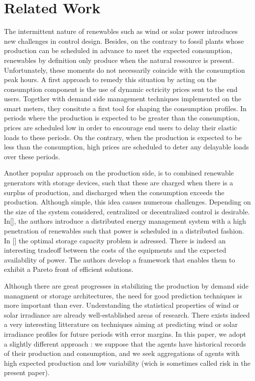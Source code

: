 \documentclass[conference]{IEEEtran}
\begin{document}
%
%

\section{Related Work}
\label{sec:related}

The intermittent nature of renewables such as wind or solar power introduces new challenges in control design. Besides, on the contrary to fossil plants whose production can be scheduled in advance to meet the expected consumption, renewables by definition only produce when the natural ressource is present. Unfortunately, these moments do not necessarily coincide with the consumption peak hours. A first approach to remedy this situation by acting on the consumption component is the use of dynamic ectricity prices sent to the end users. Together with demand side management techniques implemented on the smart meters, they consitute a first tool for shaping the consumption profiles. In periods where the production is expected to be greater than the consumption, prices are scheduled low in order to encourage end users to delay their elastic loads to these periods. On the contrary, when the production is expected to be less than the consumption, high prices are scheduled to deter any delayable loads over these periods.

Another popular approach on the production side, is to combined renewable generators with storage devices, such that these are charged when there is a surplus of production, and discharged when the consumption exceeds the production. Although simple, this idea causes numerous challenges. Depending on the size of the system considered, centralized or decentralized control is desirable. In[], the authors introduce a distributed energy management system with a high penetration of renewables such that power is scheduled in a distributed fashion. In [] the optimal storage capacity problem is adressed. There is indeed an interesting tradeoff between the costs of the equipments and the expected availability of power. The authors develop a framework that enables them to exhibit a Pareto front of efficient solutions.

Although there are great progresses in stabilizing the production by demand side managment or storage architectures, the need for good prediction techniques is more important than ever. Understanding the statistical properties of wind or solar irradiance are already well-established areas of research. There exists indeed a very interesting litterature on techniques aiming at predicting wind or solar irradiance profiles for future periods with error margins. In this paper, we adopt a slightly different approach : we suppose that the agents have historical records of their production and consumption, and we seek aggregations of agents with high expected production and low variability (wich is sometimes called risk in the present paper).
\end{document}
